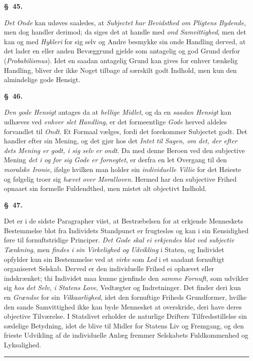 \documentclass[12pt]{article}
\newcommand{\opage}[1]{\marginnote{\footnotesize\textit{[#1]}}}
\newcommand{\ombreak}{\par\medskip\begin{center}\rule{0.32\textwidth}{0.4pt}\end{center}\medskip}
\newcommand{\slaw}[1]{\par\medskip\begin{center}\textbf{\S~#1.}\end{center}\nopagebreak}
\begin{document}
\slaw{45}
\emph{Det Onde} kan udøves saaledes, at \emph{Subjectet har Bevidsthed om Pligtens Bydende}, men dog handler derimod; da siges det at handle med \emph{ond Samvittighed}, men det kan og med \emph{Hykleri} for sig selv og Andre besmykke sin onde Handling derved, at det lader en eller anden Bevæggrund gjelde som antagelig og god Grund derfor (\emph{Probabilismus}). Idet en saadan antagelig Grund kan gives for enhver tænkelig Handling, bliver der ikke Noget tilbage af særskilt godt Indhold, men kun den almindelige gode Hensigt.

\slaw{46}
\emph{Den gode Hensigt} antages da at \emph{hellige Midlet}, og \opage{162}da en \emph{saadan Hensigt} kan udhæves ved \emph{enhver slet Handling}, er det formeentlige \emph{Gode} herved aldeles forvandlet til \emph{Ondt}. Et Formaal vælges, fordi det forekommer Subjectet godt. Det handler efter sin Mening, og det gjør hos det \emph{Intet til Sagen, om det, der efter dets Mening er godt, i sig selv er ondt}. Da med denne Beroen ved den subjective Mening \emph{det i og for sig Gode er fornegtet}, er derfra en let Overgang til den \emph{moralske Ironie}, ifølge hvilken man holder sin \emph{individuelle Villie} for det Høieste og følgelig troer sig \emph{hævet over Moralloven}. Hermed har den subjective Frihed opnaaet sin formelle Fuldendthed, men mistet alt objectivt Indhold.

\slaw{47}
Det er i de sidste Paragrapher viist, at Bestræbelsen for at erkjende Menneskets Bestemmelse blot fra Individets Standpunct er frugtesløs og kan i sin Eensidighed føre til fornuftstridige Principer. \emph{Det Gode skal ei erkjendes blot ved subjectiv Tænkning}, men \emph{findes i sin Virkelighed og Udvikling} i Staten, og Individet opfylder kun sin Bestemmelse ved at \emph{virke} som \emph{Led} i et saadant fornuftigt organiseret Selskab. Derved er den individuelle Frihed ei ophævet eller indskrænket; thi Individet maa kunne gjenfinde den \emph{samme Fornuft}, som udvikler sig \emph{hos det Selv, i Statens Love}, Vedtægter og Indretninger. Det finder deri kun en \emph{Grændse} for sin \emph{Vilkaarlighed}, idet den fornuftige Friheds Grundformer, hvilke den sande Samvittighed ikke kan byde Mennesket at overskride, deri have deres objective Tilværelse. I Statslivet erholder de naturlige Drifters Tilfredsstillelse sin sædelige Betydning, idet de blive til Midler for Statens Liv og Fremgang, og den frieste Udvikling af de individuelle Anlæg fremmer Selskabets Fuldkommenhed og Lyksalighed.

\ombreak
\end{document}
